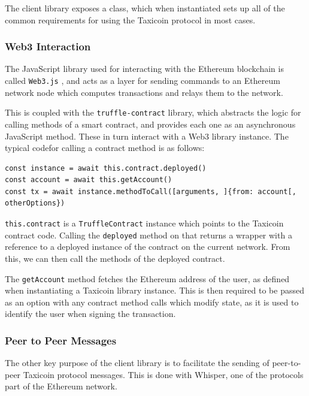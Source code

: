 The client library exposes a class, which when instantiated sets up all of the common requirements for using the Taxicoin protocol in most cases.

\subsubsection{Web3 Interaction}

The JavaScript library used for interacting with the Ethereum blockchain is called \lstinline{Web3.js} \cite{Web3}, and acts as a layer for sending commands to an Ethereum network node which computes transactions and relays them to the network.

This is coupled with the \lstinline{truffle-contract} library, which abstracts the logic for calling methods of a smart contract, and provides each one as an asynchronous JavaScript method. These in turn interact with a Web3 library instance. The typical code\footnotemark for calling a contract method is as follows:


\begin{lstlisting}
const instance = await this.contract.deployed()
const account = await this.getAccount()
const tx = await instance.methodToCall([arguments, ]{from: account[, otherOptions})
\end{lstlisting}

\lstinline{this.contract} is a \lstinline{TruffleContract} instance which points to the Taxicoin contract code. Calling the \lstinline{deployed} method on that returns a wrapper with a reference to a deployed instance of the contract on the current network. From this, we can then call the methods of the deployed contract.

The \lstinline{getAccount} method fetches the Ethereum address of the user, as defined when instantiating a Taxicoin library instance. This is then required to be passed as an option with any contract method calls which modify state, as it is used to identify the user when signing the transaction.

\subsubsection{Peer to Peer Messages}

The other key purpose of the client library is to facilitate the sending of peer-to-peer Taxicoin protocol messages. This is done with Whisper, one of the protocols part of the Ethereum network.

